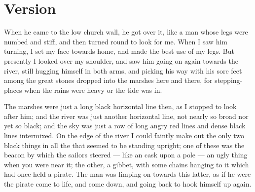 \documentclass{fiche}
\begin{document}
\newpage
\section{Version}

\begin{version}
When he came to the low church wall, he got over it, like a man whose legs were numbed and
stiff, and then turned round to look for me. When I saw him turning, I set my face towards
home, and made the best use of my legs. But presently I looked over my shoulder, and saw him
going on again towards the river, still hugging himself in both arms, and picking his way
with his sore feet among the great stones dropped into the marshes here and there, for
stepping-places when the rains were heavy or the tide was in.

The marshes were just a long black horizontal line then, as I stopped to look after him; and
the river was just another horizontal line, not nearly so broad nor yet so black; and the sky
was just a row of long angry red lines and dense black lines intermixed. On the edge of the
river I could faintly make out the only two black things in all the
 that seemed to be standing upright; one of
these was the beacon by which the sailors steered --- like an
 cask upon a pole --- an ugly thing when you were near
it; the other, a gibbet, with some chains hanging to it which had once held a pirate. The man
was limping on towards this latter, as if he were the pirate come to life, and come down, and
going back to hook himself up again.
\end{version}

\end{document}
